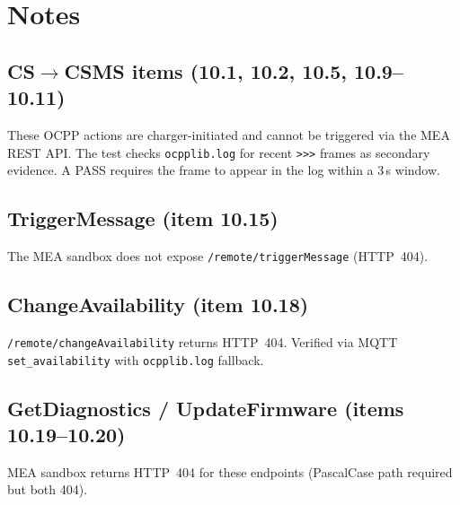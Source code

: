 \documentclass[10pt, a4paper]{article}
\begin{document}
\section{Notes}

\subsection*{CS\(\to\)CSMS items (10.1, 10.2, 10.5, 10.9--10.11)}
These OCPP actions are charger-initiated and cannot be triggered via the MEA REST API.
The test checks \texttt{ocpplib.log} for recent \texttt{>>>} frames as secondary evidence.
A PASS requires the frame to appear in the log within a 3\,s window.

\subsection*{TriggerMessage (item 10.15)}
The MEA sandbox does not expose \texttt{/remote/triggerMessage} (HTTP~404).

\subsection*{ChangeAvailability (item 10.18)}
\texttt{/remote/changeAvailability} returns HTTP~404.
Verified via MQTT \texttt{set\_availability} with \texttt{ocpplib.log} fallback.

\subsection*{GetDiagnostics / UpdateFirmware (items 10.19--10.20)}
MEA sandbox returns HTTP~404 for these endpoints (PascalCase path required but both 404).
\end{document}

